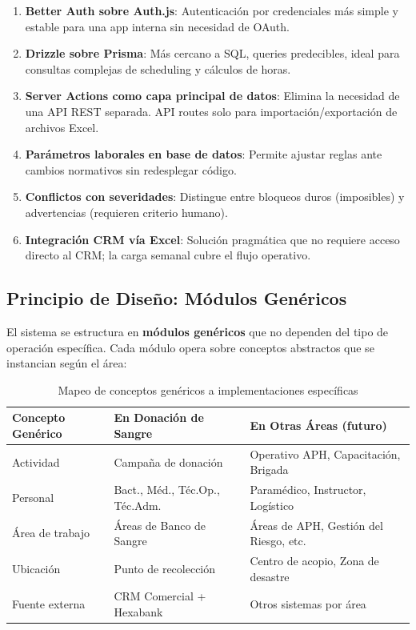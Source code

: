 \documentclass[10pt,a4paper]{article}
\begin{document}
\begin{enumerate}[leftmargin=2em]
    \item \textbf{Better Auth sobre Auth.js}: Autenticaci\'{o}n por credenciales m\'{a}s simple y estable para una app interna sin necesidad de OAuth.
    \item \textbf{Drizzle sobre Prisma}: M\'{a}s cercano a SQL, queries predecibles, ideal para consultas complejas de scheduling y c\'{a}lculos de horas.
    \item \textbf{Server Actions como capa principal de datos}: Elimina la necesidad de una API REST separada. API routes solo para importaci\'{o}n/exportaci\'{o}n de archivos Excel.
    \item \textbf{Par\'{a}metros laborales en base de datos}: Permite ajustar reglas ante cambios normativos sin redesplegar c\'{o}digo.
    \item \textbf{Conflictos con severidades}: Distingue entre bloqueos duros (imposibles) y advertencias (requieren criterio humano).
    \item \textbf{Integraci\'{o}n CRM v\'{i}a Excel}: Soluci\'{o}n pragm\'{a}tica que no requiere acceso directo al CRM; la carga semanal cubre el flujo operativo.
\end{enumerate}

\subsection{Principio de Diseño: M\'{o}dulos Gen\'{e}ricos}

El sistema se estructura en \textbf{m\'{o}dulos gen\'{e}ricos} que no dependen del tipo de operaci\'{o}n espec\'{i}fica. Cada m\'{o}dulo opera sobre conceptos abstractos que se instancian seg\'{u}n el \'{a}rea:

\begin{table}[h!]
\centering
\begin{tabularx}{\textwidth}{|l|l|X|}
\hline
\textbf{Concepto Gen\'{e}rico} & \textbf{En Donaci\'{o}n de Sangre} & \textbf{En Otras \'{A}reas (futuro)} \\
\hline
Actividad & Campaña de donaci\'{o}n & Operativo APH, Capacitaci\'{o}n, Brigada \\
\hline
Personal & Bact., M\'{e}d., T\'{e}c.Op., T\'{e}c.Adm. & Param\'{e}dico, Instructor, Log\'{i}stico \\
\hline
\'{A}rea de trabajo & \'{A}reas de Banco de Sangre & \'{A}reas de APH, Gesti\'{o}n del Riesgo, etc. \\
\hline
Ubicaci\'{o}n & Punto de recolecci\'{o}n & Centro de acopio, Zona de desastre \\
\hline
Fuente externa & CRM Comercial + Hexabank & Otros sistemas por \'{a}rea \\
\hline
\end{tabularx}
\caption{Mapeo de conceptos gen\'{e}ricos a implementaciones espec\'{i}ficas}
\end{table}
\end{document}

